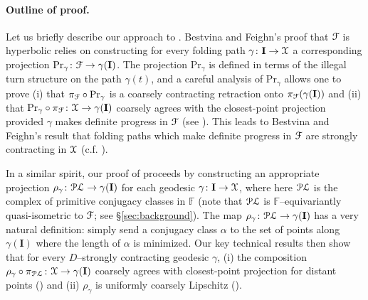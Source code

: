 \documentclass[letterpaper,fleqn]{article}
\theoremstyle{plain}
\theoremstyle{definition}
\newcommand{\free}{\mathbb{F}} %
\newcommand{\factor}{{\EuScript F}} %
\newcommand{\fc}{\factor} %
\newcommand{\pl}{{\EuScript{PL}}} %
\newcommand{\os}{{\EuScript X}} %
\newcommand{\fproj}{\pi_\fc} %
\newcommand{\plproj}{\pi_\pl} %
\newcommand{\bfproj}{\mathrm{Pr}} %
\newcommand{\minlen}{m}  %
\newcommand{\minpts}{\rho} %
\newcommand{\I}{\mathbf{I}}
\begin{document}
\paragraph{Outline of proof.} Let us briefly describe our approach to . Bestvina and Feighn's \cite{BFhyp} proof that $\fc$ is hyperbolic relies on constructing for every folding path $\gamma\colon \I\to \os$ a corresponding projection $\bfproj_\gamma\colon\fc\to\gamma(\I)$. The projection $\bfproj_\gamma$ is defined in terms of the illegal turn structure on the path $\gamma(t)$, and a careful analysis of $\bfproj_\gamma$  allows one to prove 
(i) that $\fproj\circ\bfproj_\gamma$ is a coarsely contracting retraction onto $\fproj(\gamma(\I))$ \cite[Proposition 7.2]{BFhyp} and 
(ii) that $\bfproj_\gamma\circ\fproj\colon \os\to\gamma(\I)$ coarsely agrees with the closest-point projection provided $\gamma$ makes definite progress in $\fc$ (see \cite[Lemma 4.11]{DT1}). This leads to Bestvina and Feighn's result \cite[Corollary 7.3]{BFhyp} that folding paths which make definite progress in $\fc$ are strongly contracting in $\os$ (c.f. ).

In a similar spirit, our proof of  proceeds by constructing an appropriate projection $\minpts_\gamma\colon\pl\to\gamma(\I)$ for each geodesic $\gamma\colon \I\to \os$, where here $\pl$ is the complex of primitive conjugacy classes in $\free$ (note that $\pl$ is $\free$--equivariantly quasi-isometric to $\fc$; see \S\ref{sec:background}). The map $\minpts_\gamma\colon \pl\to \gamma(\I)$ has a very natural definition: simply send a conjugacy class $\alpha$ to the set of points along $\gamma(\I)$ where the length of $\alpha$ is minimized. Our key technical results then show that for every $D$--strongly contracting geodesic $\gamma$, (i) the composition $\minpts_\gamma\circ \plproj\colon \os\to \gamma(\I)$ coarsely agrees with closest-point projection for distant points () and  (ii) $\minpts_\gamma$ is uniformly coarsely Lipschitz ().
\end{document}
